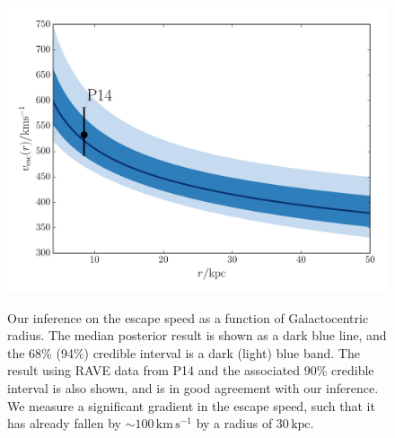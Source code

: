 \documentclass[useAMS,twocolumn,usenatbib]{mn2e}
\def\kpc{{\,\mathrm{kpc}}}
\def\kms{{\,\mathrm{km\,s^{-1}}}}
\begin{document}
\begin{figure}
\includegraphics[width=\columnwidth]{plots/vesc_posterior}\\
\caption{Our inference on the escape speed as a function of Galactocentric radius. 
The median posterior result is shown as a {} dark blue line, and the 68\% (94\%) credible interval is a dark (light) blue band. 
The result using RAVE data from P14 and the associated 90\% credible interval is also shown, and is in good agreement with our inference. 
We measure a significant gradient in the escape speed, such that it has already fallen by $\sim 100\kms$ by  a radius of $30\kpc$.}
\label{fig:vesc_posterior}
\end{figure}
\end{document}
